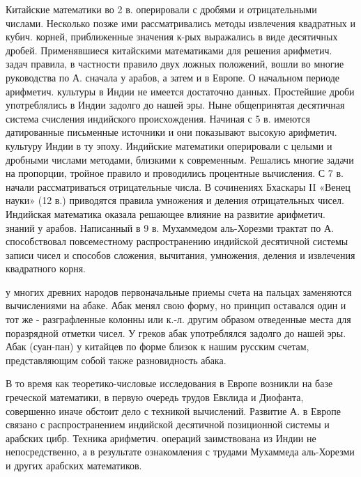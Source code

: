 \documentclass[10pt]{article}
\begin{document}
Китайские математики во 2 в. оперировали с дробями и отрицательными числами. Несколько позже ими рассматривались методы извлечения квадратных и кубич. корней, приближенные значения к-рых выражались в виде десятичных дробей. Применявшиеся китайскими математиками для решения арифметич. задач правила, в частности правило двух ложных положений, вошли во многие руководства по А. сначала у арабов, а затем и в Европе. О начальном периоде арифметич. культуры в Индии не имеется достаточно данных. Простейшие дроби употреблялись в Индии задолго до нашей эры. Ныне общепринятая десятичная система счисления индийского происхождения. Начиная с 5 в. имеются датированные письменные источники и они показывают высокую арифметич. культуру Индии в ту эпоху. Индийские математики оперировали с целыми и дробными числами методами, близкими к современным. Решались многие задачи на пропорции, тройное правило и проводились процентные вычисления. С 7 в. начали рассматриваться отрицательные числа. В сочинениях Бхаскары II «Венец науки» (12 в.) приводятся правила умножения и деления отрицательных чисел. Индийская математика оказала решающее влияние на развитие арифметич. знаний у арабов. Написанный в 9 в. Мухаммедом аль-Хорезми трактат по А. способствовал повсеместному распространению индийской десятичной системы записи чисел и способов сложения, вычитания, умножения, деления и извлечения квадратного корня.



у многих древних народов первоначальные приемы счета на пальцах заменяются вычислениями на абаке. Абак менял свою форму, но принцип оставался один и тот же - разграфленные колонны или к.-л. другим образом отведенные места для поразрядной отметки чисел. У греков абак употреблялся задолго до нашей эры. Абак (суан-пан) у китайцев по форме близок к нашим русским счетам, представляющим собой также разновидность абака.



В то время как теоретико-числовые исследования в Европе возникли на базе греческой математики, в первую очередь трудов Евклида и Диофанта, совершенно иначе обстоит дело с техникой вычислений. Развитие А. в Европе связано с распространением индийской десятичной позиционной системы и арабских цибр. Техника арифметич. операций заимствована из Индии не непосредственно, а в результате ознакомления с трудами Мухаммеда аль-Хорезми и других арабских математиков.
\end{document}
